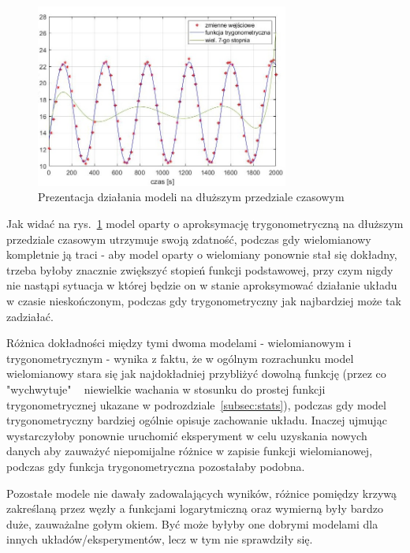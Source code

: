 \documentclass[a4paper, 12pt]{mwart}
\begin{document}
		\begin{figure}[h]
			\begin{center}
				\includegraphics[width = 0.74\textwidth]{graphs/7.jpg}	
				\caption{Prezentacja działania modeli na dłuższym przedziale czasowym}
				\label{fig:7}
			\end{center}
		\end{figure}

		Jak widać na rys.~\ref{fig:7} model oparty o aproksymację trygonometryczną na dłuższym przedziale czasowym utrzymuje
		swoją zdatność, podczas gdy wielomianowy kompletnie ją traci - aby model oparty o wielomiany ponownie stał się 
		dokładny, trzeba byłoby znacznie zwiększyć stopień funkcji podstawowej, przy czym nigdy nie nastąpi sytuacja w której
		będzie on w stanie aproksymować działanie układu w czasie nieskończonym, podczas gdy trygonometryczny jak najbardziej
		może tak zadziałać.

		Różnica dokładności między tymi dwoma modelami - wielomianowym i trygonometrycznym - wynika z faktu, że w ogólnym
		rozrachunku model wielomianowy stara się jak najdokładniej przybliżyć dowolną funkcję (przez co "wychwytuje" ~
		niewielkie wachania w stosunku do prostej funkcji trygonometrycznej ukazane w podrozdziale~\ref{subsec:stats}), 
		podczas gdy model trygonometryczny bardziej ogólnie opisuje zachowanie układu. Inaczej ujmując wystarczyłoby ponownie
		uruchomić eksperyment w celu uzyskania nowych danych aby zauważyć niepomijalne różnice w zapisie funkcji wielomianowej,
		podczas gdy funkcja trygonometryczna pozostałaby podobna.

		Pozostałe modele nie dawały zadowalających wyników, różnice pomiędzy krzywą zakreślaną przez węzły a funkcjami logarytmiczną
		oraz wymierną były bardzo duże, zauważalne gołym okiem. Być może byłyby one dobrymi modelami dla innych układów/eksperymentów,
		lecz w tym nie sprawdziły się.
\end{document}

